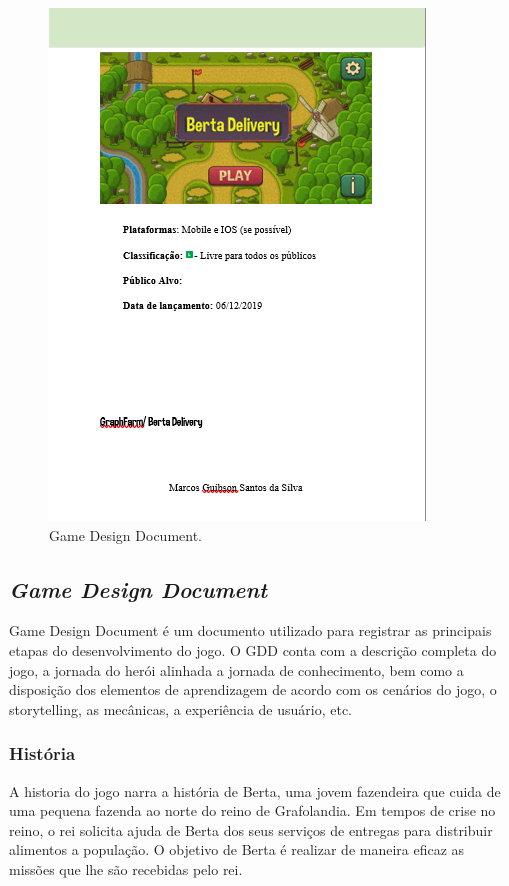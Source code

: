 \documentclass[10pt, conference, compsocconf]{IEEEtran}
\begin{document}
\begin{itemize}
	\begin{figure}[!htbp]
		\centerline{\includegraphics[scale=0.5]{Figuras/gddd.png}}
		\caption{Game Design Document.}
		\label{fig1}
	\end{figure}
	
\end{itemize}

\subsection{\textit{Game Design Document}} \label{gdd}
Game Design Document é um documento utilizado para registrar as principais etapas do desenvolvimento do jogo. O GDD conta com a descrição completa do jogo, a jornada do herói alinhada a jornada de conhecimento, bem como a disposição dos elementos de aprendizagem de acordo com os cenários do jogo, o storytelling, as mecânicas, a experiência de usuário, etc. 

\subsubsection{História}
A historia do jogo narra a história de Berta, uma jovem fazendeira que cuida de uma pequena fazenda ao norte do reino de Grafolandia. Em tempos de crise no reino, o rei solicita ajuda de Berta dos seus serviços de entregas para distribuir alimentos a população. O objetivo de Berta é realizar de maneira eficaz as missões que lhe são recebidas pelo rei.
\end{document}
